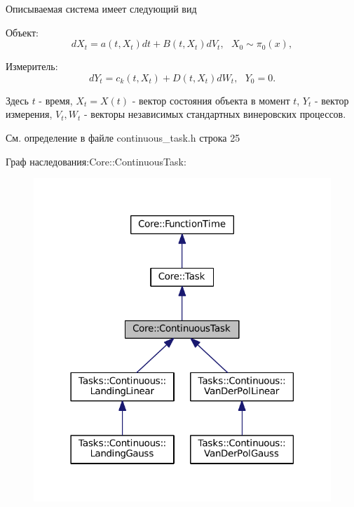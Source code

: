 Описываемая система имеет следующий вид


\begin{DoxyItemize}
\item Объект\+: \[dX_t = a(t, X_t)dt + B(t, X_t)dV_t,\ \ \ X_0 \sim \pi_0(x),\]
\item Измеритель\+: \[dY_t = c_k(t, X_t) + D(t, X_t)dW_t,\ \ \ Y_0 = 0.\]
\end{DoxyItemize}

Здесь $t$ -\/ время, $X_t = X(t)$ -\/ вектор состояния объекта в момент $t$, $Y_t$ -\/ вектор измерения, $V_t, W_t$ -\/ векторы независимых стандартных винеровских процессов. 

См. определение в файле continuous\+\_\+task.\+h строка 25



Граф наследования\+:Core\+:\+:Continuous\+Task\+:
\nopagebreak
\begin{figure}[H]
\begin{center}
\leavevmode
\includegraphics[width=318pt]{class_core_1_1_continuous_task__inherit__graph}
\end{center}
\end{figure}


